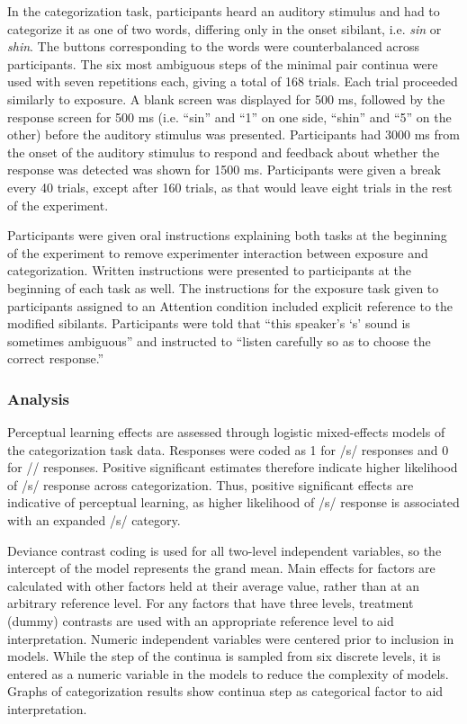 In the categorization task, participants heard an auditory stimulus and had to categorize it as one of two words, differing only in the onset sibilant, i.e. \emph{sin} or \emph{shin}.  
The buttons corresponding to the words were counterbalanced across participants.  
The six most ambiguous steps of the minimal pair continua were used with seven repetitions each, giving a total of 168 trials.
Each trial proceeded similarly to exposure.
A blank screen was displayed for 500 ms, followed by the response screen for 500 ms (i.e. ``sin'' and ``1'' on one side, ``shin'' and ``5'' on the other) before the auditory stimulus was presented.
Participants had 3000 ms from the onset of the auditory stimulus to respond and feedback about whether the response was detected was shown for 1500 ms.
Participants were given a break every 40 trials, except after 160 trials, as that would leave eight trials in the rest of the experiment.

Participants were given oral instructions explaining both tasks at the beginning of the experiment to remove experimenter interaction between exposure and categorization.
Written instructions were presented to participants at the beginning of each task as well.
The instructions for the exposure task given to participants assigned to an Attention condition included explicit reference to the modified sibilants.
Participants were told that ``this speaker's `s' sound is sometimes ambiguous'' and instructed to ``listen carefully so as to choose the correct response.''

\subsubsection{Analysis}

Perceptual learning effects are assessed through logistic mixed-effects models of the categorization task data.
Responses were coded as 1 for /s/ responses and 0 for /\textesh/ responses.
Positive significant estimates therefore indicate higher likelihood of /s/ response across categorization.
Thus, positive significant effects are indicative of perceptual learning, as higher likelihood of /s/ response is associated with an expanded /s/ category.

Deviance contrast coding is used for all two-level independent variables, so the intercept of the model represents the grand mean.
Main effects for factors are calculated with other factors held at their average value, rather than at an arbitrary reference level.
For any factors that have three levels, treatment (dummy) contrasts are used with an appropriate reference level to aid interpretation.
Numeric independent variables were centered prior to inclusion in models.
While the step of the continua is sampled from six discrete levels, it is entered as a numeric variable in the models to reduce the complexity of models.
Graphs of categorization results show continua step as categorical factor to aid interpretation.

